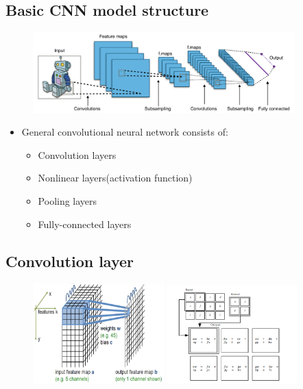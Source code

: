 \subsection{Basic CNN model structure}
\begin{figure}[H]
\centering
\includegraphics[width=0.9\textwidth]{figures/CNNPic}
\end{figure}

\begin{itemize}
\item General convolutional neural network consists of:
\begin{itemize}
\item Convolution layers
\item Nonlinear layers(activation function)
\item Pooling layers
\item Fully-connected layers

\end{itemize}
\end{itemize}




\subsection{Convolution layer}
\begin{figure}[H]
\centering
\includegraphics[width=0.45\textwidth]{figures/CNNLayer1} 
\includegraphics[width=0.45\textwidth]{figures/CNNLayer2}
\end{figure}




